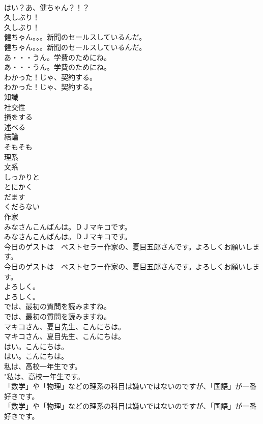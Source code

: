 \documentclass[8pt]{extreport}
\begin{document}
\begin{CJK}{UTF8}{min}
\\	はい？あ、健ちゃん？！？ 
\\	久しぶり！	
\\	久しぶり！ 
\\	健ちゃん。。。新聞のセールスしているんだ。	
\\	健ちゃん。。。新聞のセールスしているんだ。 
\\	あ・・・うん。学費のためにね。	
\\	あ・・・うん。学費のためにね。 
\\	わかった！じゃ、契約する。	
\\	わかった！じゃ、契約する。 
\\	知識
\\	社交性
\\	損をする
\\	述べる
\\	結論
\\	そもそも
\\	理系
\\	文系
\\	しっかりと
\\	とにかく
\\	だます
\\	くだらない
\\	作家
\\	みなさんこんばんは。ＤＪマキコです。	
\\	みなさんこんばんは。ＤＪマキコです。 
\\	今日のゲストは　ベストセラー作家の、夏目五郎さんです。よろしくお願いします。	
\\	今日のゲストは　ベストセラー作家の、夏目五郎さんです。よろしくお願いします。 
\\	よろしく。	
\\	よろしく。 
\\	では、最初の質問を読みますね。	
\\	では、最初の質問を読みますね。 
\\	マキコさん、夏目先生、こんにちは。	
\\	マキコさん、夏目先生、こんにちは。 
\\	はい。こんにちは。	
\\	はい。こんにちは。 
\\	私は、高校一年生です。	
\\	"私は、高校一年生です。 
\\	「数学」や「物理」などの理系の科目は嫌いではないのですが、「国語」が一番好きです。	
\\	「数学」や「物理」などの理系の科目は嫌いではないのですが、「国語」が一番好きです。 

\end{CJK}
\end{document}
